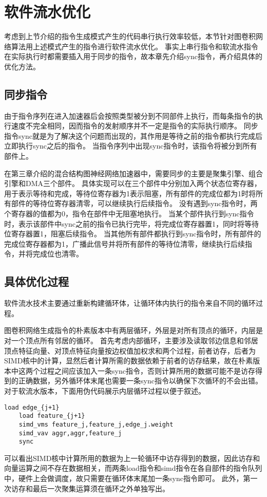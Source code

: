 \section{软件流水优化}
考虑到上节介绍的指令生成模式产生的代码串行执行效率较低，本节针对图卷积网络算法用上述模式产生的指令进行软件流水优化。
事实上串行指令和软流水指令在实际执行时都需要插入用于同步的指令，故本章先介绍sync指令，再介绍具体的优化方法。

\subsection{同步指令}
由于指令序列在进入加速器后会按照类型被分到不同部件上执行，而每条指令的执行速度不完全相同，因而指令的发射顺序并不一定是指令的实际执行顺序。
同步指令sync就是为了解决这个问题而出现的，其作用是等待之前的指令都执行完成后立即执行sync之后的指令。
当指令序列中出现sync指令时，该指令将被分到所有部件上。

在第三章介绍的混合结构图神经网络加速器中，需要同步的主要是聚集引擎、组合引擎和DMA三个部件。
具体实现可以在三个部件中分别加入两个状态位寄存器，用于表示等待和完成，等待位寄存器为1表示阻塞，所有部件的完成位都为1时将所有部件的等待位寄存器清零，可以继续执行后续指令。
没有遇到sync指令时，两个寄存器的值都为0，指令在部件中无阻塞地执行。
当某个部件执行到sync指令时，表示该部件中sync之前的指令已执行完毕，将完成位寄存器置1，同时将等待位寄存器置1，阻塞后续指令。
当其他所有部件都执行到sync指令时，所有部件的完成位寄存器都为1，广播此信号并将所有部件的等待位清零，继续执行后续指令，并将完成位也清零。

\subsection{具体优化过程}
软件流水技术主要通过重新构建循环体，让循环体内执行的指令来自不同的循环过程。

图卷积网络生成指令的朴素版本中有两层循环，外层是对所有顶点的循环，内层是对一个顶点所有邻居的循环。
首先考虑内部循环，主要涉及读取邻边信息和邻居顶点特征向量、对顶点特征向量按边权值加权求和两个过程，前者访存，后者为SIMD核中的计算，显然后者计算所需的数据依赖于前者的访存结果，故在朴素版本中这两个过程之间应该加入一条sync指令，否则计算所用的数据可能不是访存得到的正确数据，另外循环体末尾也需要一条sync指令以确保下次循环的不会出错。
对于软流水版本，下面用伪代码展示内层循环过程以便于叙述。
\begin{lstlisting}[language={[x86masm]Assembler}] 
    load edge_{j+1}
    load feature_{j+1}
    simd_vms feature_j,feature_j,edge_j.weight
    simd_vav aggr,aggr,feature_j
    sync
\end{lstlisting}
可以看出SIMD核中计算所用的数据为上一轮循环中访存得到的数据，因此访存和向量运算之间不存在数据相关，而两条load指令和simd指令在各自部件的指令队列中，硬件上会做调度，故只需要在循环体末尾加一条sync指令即可。
此外，第一次访存和最后一次聚集运算须在循环之外单独写出。

